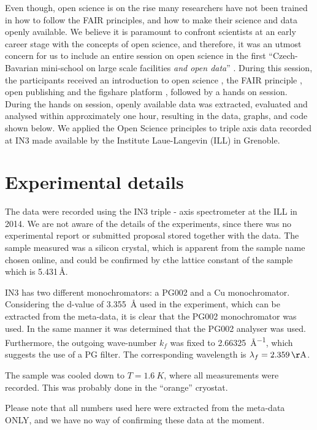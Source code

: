 \documentclass[aps,prx,reprint,amsmath,amssymb,superscriptaddress,showpacs]{revtex4-1}
\begin{document}
Even though, open science is on the rise many researchers have not been trained in how to follow the FAIR principles, and how to make their science and data openly available.
We believe it is paramount to confront scientists at an early career stage with the concepts of open science, and therefore, it was an utmost concern for us to include an entire session on open science in the first ``Czech-Bavarian mini-school on large scale facilities \emph{and open data}'' \cite{mini-school}.
During this session, the participants received an introduction to open science \cite{foster}, the FAIR principle \cite{FAIR}, open publishing \cite{arXiv} and the figshare platform \cite{figshare}, followed by a hands on session.
During the hands on session, openly available data was extracted, evaluated and analysed within approximately one hour, resulting in the data, graphs, and code \cite{data-evaluation, data-docker} shown below.
We applied the Open Science principles to triple axis data recorded at IN3 \cite{data} made available by the Institute Laue-Langevin (ILL) in Grenoble.

\section{Experimental details}

The data were recorded using the IN3 triple - axis spectrometer \cite{IN3} at the ILL in 2014.
We are not aware of the details of the experiments, since there was no experimental report or submitted proposal stored together with the data.
The sample measured was a silicon crystal, which is apparent from the sample name chosen online, and could be confirmed by cthe lattice constant of the sample which is 5.431\,\AA \cite{Hom1975}.


IN3 has two different monochromators: a PG002 and a Cu monochromator.
Considering the d-value of \SI{3.355}{\AA} used in the experiment, which can be extracted from the meta-data, it is clear that the PG002 monochromator was used.
In the same manner it was determined that the PG002 analyser was used. 
Furthermore, the outgoing wave-number $k_f$ was fixed to \SI{2.66325}{\AA^{-1}}, which suggests the use of a PG filter. 
The corresponding wavelength is $\lambda_f=\SI{2.359}{\AA}$.

The sample was cooled down to $T = \SI{1.6}{K}$, where all measurements were recorded. 
This was probably done in the ``orange'' cryostat.

Please note that all numbers used here were extracted from the meta-data ONLY, and we have no way of confirming these data at the moment. 
\end{document}
